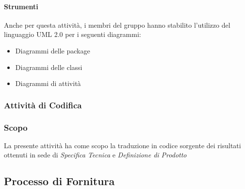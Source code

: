 		 
		 \paragraph*{Strumenti}
		 Anche per questa attività, i membri del gruppo hanno stabilito l'utilizzo del linguaggio UML 2.0 per i seguenti
		 diagrammi:
		 \begin{itemize}
			\item Diagrammi delle package  
			\item Diagrammi delle classi	
			\item Diagrammi di attività
		\end{itemize}
			 
		
		\subsubsection{Attività di Codifica}
                \subsubsection{Scopo}
                La presente attività ha come scopo la traduzione in codice sorgente dei risultati ottenuti in sede
                di \textit{Specifica Tecnica} e \textit{Definizione di Prodotto}


                
                
                
		
	\subsection{Processo di Fornitura}
